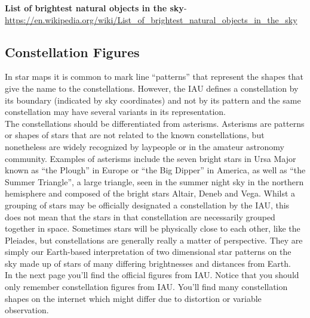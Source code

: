 \documentclass[a4paper,12pt]{extarticle}
\begin{document}
\textbf{List of brightest natural objects in the sky}- \url{https://en.wikipedia.org/wiki/List_of_brightest_natural_objects_in_the_sky}
\subsection{Constellation Figures}

In star maps it is common to mark line “patterns” that represent the shapes that give the name to the constellations. However, the IAU defines a constellation by its boundary (indicated by sky coordinates) and not by its pattern and the same constellation may have several variants in its representation.\\

The constellations should be differentiated from asterisms. Asterisms are patterns or shapes of stars that are not related to the known constellations, but nonetheless are widely recognized by laypeople or in the amateur astronomy community. Examples of asterisms include the seven bright stars in Ursa Major known as “the Plough” in Europe or “the Big Dipper” in America, as well as “the Summer Triangle”, a large triangle, seen in the summer night sky in the northern hemisphere and composed of the bright stars Altair, Deneb and Vega. Whilst a grouping of stars may be officially designated a constellation by the IAU, this does not mean that the stars in that constellation are necessarily grouped together in space. Sometimes stars will be physically close to each other, like the Pleiades, but constellations are generally really a matter of perspective. They are simply our Earth-based interpretation of two dimensional star patterns on the sky made up of stars of many differing brightnesses and distances from Earth.\\

In the next page you'll find the official figures from IAU. Notice that you should only remember constellation figures from IAU. You'll find many constellation shapes on the internet which might differ due to distortion or variable observation. 
\end{document}
